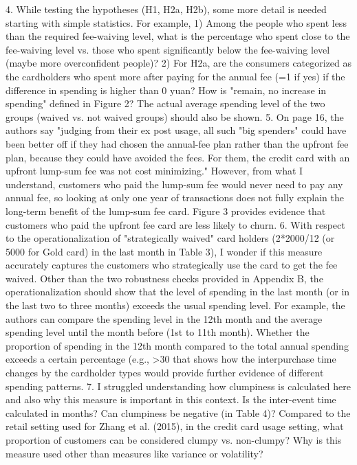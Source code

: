 \documentclass[titlepage,12pt,letterpaper]{article}
\numberwithin{equation}{section}
\begin{document}
4. 	While testing the hypotheses (H1, H2a, H2b), some more detail is needed starting with simple statistics. For example,
1) 	Among the people who spent less than the required fee-waiving level, what is the percentage who spent close to the fee-waiving level vs. those who spent significantly below the fee-waiving level (maybe more overconfident people)?
2) 	For H2a, are the consumers categorized as the cardholders who spent more after paying for the annual fee (=1 if yes) if the difference in spending is higher than 0 yuan? How is "remain, no increase in spending" defined in Figure 2? The actual average spending level of the two groups (waived vs. not waived groups) should also be shown.
5. 	On page 16, the authors say "judging from their ex post usage, all such "big spenders" could have been better off if they had chosen the annual-fee plan rather than the upfront fee plan, because they could have avoided the fees. For them, the credit card with an upfront lump-sum fee was not cost minimizing." However, from what I understand, customers who paid the lump-sum fee would never need to pay any annual fee, so looking at only one year of transactions does not fully explain the long-term benefit of the lump-sum fee card. Figure 3 provides evidence that customers who paid the upfront fee card are less likely to churn.
6. 	With respect to the operationalization of "strategically waived" card holders (2*2000/12 (or 5000 for Gold card) in the last month in Table 3), I wonder if this measure accurately captures the customers who strategically use the card to get the fee waived. Other than the two robustness checks provided in Appendix B, the operationalization should show that the level of spending in the last month (or in the last two to three months) exceeds the usual spending level. For example, the authors can compare the spending level in the 12th month and the average spending level until the month before (1st to 11th month). Whether the proportion of spending in the 12th month compared to the total annual spending exceeds a certain percentage (e.g., >30%
that shows how the interpurchase time changes by the cardholder types would provide further evidence of different spending patterns.  
7. 	I struggled understanding how clumpiness is calculated here and also why this measure is important in this context. Is the inter-event time calculated in months? Can clumpiness be negative (in Table 4)? Compared to the retail setting used for Zhang et al. (2015), in the credit card usage setting, what proportion of customers can be considered clumpy vs. non-clumpy? Why is this measure used other than measures like variance or volatility?
\end{document}
